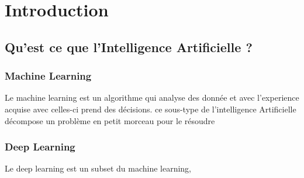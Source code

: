 \chapter{Introduction}
\section{Qu'est ce que l'Intelligence Artificielle ?}
\subsection{Machine Learning}
Le machine learning est un algorithme qui analyse des donnée et 
avec l'experience acquise avec celles-ci prend des décisions. \newline 
ce sous-type de l'intelligence Artificielle décompose un problème
en petit morceau pour le résoudre
\subsection{Deep Learning}
Le deep learning est un subset du machine learning, 